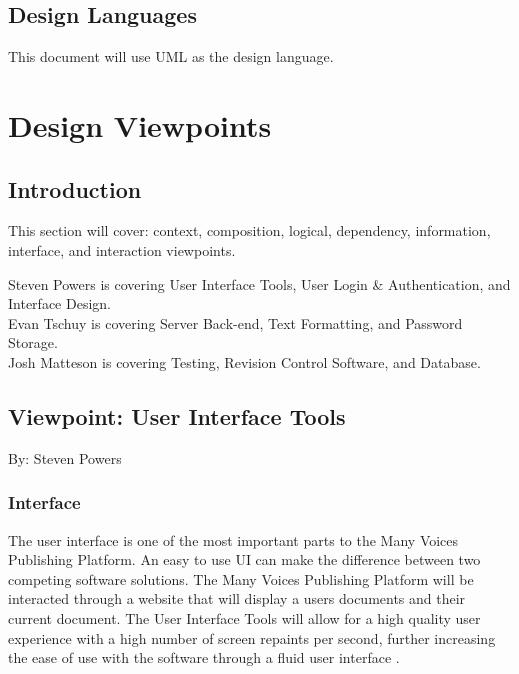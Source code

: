 \documentclass[onecolumn, draftclsnofoot,10pt, compsoc]{IEEEtran}
\begin{document}
\subsection{Design Languages}
{\noindent This document will use UML as the design language.\par}





\clearpage
\section{Design Viewpoints}

\subsection{Introduction}
\noindent This section will cover: context, composition, logical, dependency, information, interface, and interaction viewpoints. 

\noindent Steven Powers is covering User Interface Tools, 
User Login \& Authentication, and Interface Design.  \\
\noindent Evan Tschuy is covering Server Back-end, Text Formatting, 
and Password Storage. \\
\noindent Josh Matteson is covering Testing, Revision Control Software, 
and Database. \\



\subsection{Viewpoint: User Interface Tools}
{\noindent By: Steven Powers \par}

\subsubsection{Interface}
\noindent The user interface is one of the most important parts to the Many
Voices Publishing Platform. An easy to use UI can make the difference between
two competing software solutions. The Many Voices Publishing Platform will be
interacted through a website that will display a users documents and their 
current document. The User Interface Tools will allow for a high quality user 
experience with a high number of screen repaints per second, further 
increasing the ease of use with the software through a fluid user interface 
\cite{Eisenberg}. \\
\end{document}
